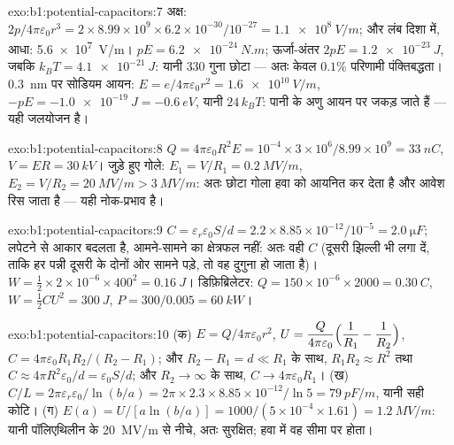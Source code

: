 \begin{solution}{exo:b1:potential-capacitors:7}
अक्ष: $2p/4\pi\varepsilon_0r^3 = 2 \times 8.99 \times 10^9 \times 6.2 \times 10^{-30}/10^{-27} =
\qty{1.1e8}{V/m}$; और लंब दिशा में, आधा: \qty{5.6e7}{V/m}।  $pE =
\qty{6.2e-24}{N.m}$; ऊर्जा-अंतर $2pE = \qty{1.2e-23}{J}$, जबकि $k_BT =
\qty{4.1e-21}{J}$: यानी $330$ गुना छोटा --- अतः केवल $0.1\%$ परिणामी
पंक्तिबद्धता। \qty{0.3}{nm} पर सोडियम आयन: $E = e/4\pi\varepsilon_0r^2 = \qty{1.6e10}{V/m}$, $-pE
= \qty{-1.0e-19}{J} = \qty{-0.6}{eV}$, यानी $24\,k_BT$: पानी के अणु आयन पर
जकड़ जाते हैं --- यही जलयोजन है।
\end{solution}

\begin{solution}{exo:b1:potential-capacitors:8}
$Q = 4\pi\varepsilon_0R^2E = 10^{-4} \times 3 \times 10^6/8.99 \times 10^9 = \qty{33}{nC}$,
$V = ER = \qty{30}{kV}$। जुड़े हुए गोले: $E_1 = V/R_1 = \qty{0.2}{MV/m}$,
$E_2 = V/R_2 = \qty{20}{MV/m} > \qty{3}{MV/m}$: अतः छोटा गोला हवा को आयनित
कर देता है और आवेश रिस जाता है --- यही नोक-प्रभाव है।
\end{solution}

\begin{solution}{exo:b1:potential-capacitors:9}
$C = \varepsilon_r\varepsilon_0S/d = 2.2 \times 8.85 \times 10^{-12}/10^{-5} = \qty{2.0}{\micro F}$;
लपेटने से आकार बदलता है, आमने-सामने का क्षेत्रफल नहीं: अतः वही $C$ (दूसरी
झिल्ली भी लगा दें, ताकि हर पन्नी दूसरी के दोनों ओर सामने पड़े, तो वह दुगुना
हो जाता है)। $W = \tfrac12 \times 2 \times 10^{-6} \times 400^2 = \qty{0.16}{J}$। डिफ़िब्रिलेटर:
$Q = 150 \times 10^{-6} \times 2000 = \qty{0.30}{C}$, $W = \tfrac12CU^2 = \qty{300}{J}$,
$P = 300/0.005 = \qty{60}{kW}$।
\end{solution}

\begin{solution}{exo:b1:potential-capacitors:10}
(क) $E = Q/4\pi\varepsilon_0r^2$, $U = \dfrac{Q}{4\pi\varepsilon_0}\Bigl(\dfrac1{R_1} -
\dfrac1{R_2}\Bigr)$, $C = 4\pi\varepsilon_0R_1R_2/(R_2 - R_1)$; और $R_2 - R_1 = d \ll
R_1$ के साथ, $R_1R_2 \approx R^2$ तथा $C \approx 4\pi R^2\varepsilon_0/d = \varepsilon_0S/d$; और $R_2 \to
\infty$ के साथ, $C \to 4\pi\varepsilon_0R_1$। (ख) $C/L = 2\pi\varepsilon_r\varepsilon_0/\ln(b/a) = 2\pi \times 2.3
\times 8.85 \times 10^{-12}/\ln5 = \qty{79}{pF/m}$, यानी सही कोटि। (ग) $E(a) =
U/[a\ln(b/a)] = 1000/(5 \times 10^{-4} \times 1.61) = \qty{1.2}{MV/m}$: यानी
पॉलिएथिलीन के \qty{20}{MV/m} से नीचे, अतः सुरक्षित; हवा में वह सीमा पर होता।
\end{solution}

